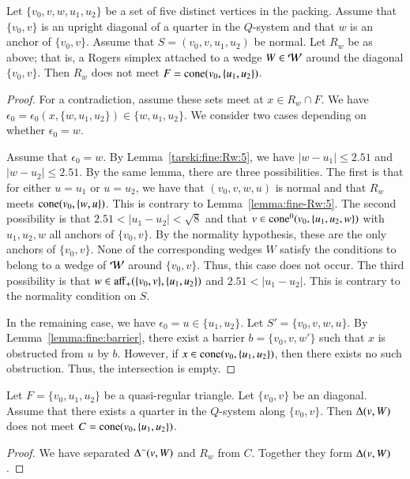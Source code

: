\begin{lemma}\label{lemma:fine-Rw:5}
Let $\{v_0,v,w,u_1,u_2\}$ be a set of five distinct vertices in the
packing.  Assume that $\{v_0,v\}$ is an upright diagonal of a quarter
in the $Q$-system and that $w$ is an anchor of $\{v_0,v\}$.
Assume that $S=(v_0,v,u_1,u_2)$ be normal.
Let $R_w$ be as above; that is, a Rogers simplex attached to a wedge
$W\in {\mathcal W}$ around the diagonal $\{v_0,v\}$.
Then $R_w$ does not meet $F={\operatorname{cone}}(v_0,\{u_1,u_2\})$.
\end{lemma}

\begin{proof}
For a contradiction, assume these sets meet at $x\in R_w\cap F$.
We have $\epsilon_0=\epsilon_0(x,\{w,u_1,u_2\})\in\{w,u_1,u_2\}$.  We consider
two cases depending on whether $\epsilon_0=w$.

Assume that $\epsilon_0=w$.  By Lemma~\ref{tarski:fine:Rw:5},
we have $|w-u_1|\le 2.51$ and $|w-u_2|\le 2.51$.  By the same
lemma, 
there are three possibilities.  The first is that
for either $u=u_1$ or $u=u_2$, we have that $(v_0,v,w,u)$ is normal
and that $R_w$ meets ${\operatorname{cone}}(v_0,\{w,u\})$.  This is contrary to
Lemma~\ref{lemma:fine-Rw:5}.
The second possibility is that
$2.51<|u_1-u_2|<\sqrt8$ and that $v\in{\operatorname{cone}}^0(v_0,\{u_1,u_2,w\})$
with $u_1,u_2,w$ all anchors of $\{v_0,v\}$.  By the normality
hypothesis, these are the only anchors of $\{v_0,v\}$.  None of the
corresponding wedges $W$ satisfy the conditions to belong to
a wedge of ${\mathcal W}$ around $\{v_0,v\}$.  Thus, this case does not
occur. The third possibility is that $w\in {\operatorname{aff}}_+(\{v_0,v\},\{u_1,u_2\})$
and $2.51<|u_1-u_2|$.  This is contrary to the normality
condition on $S$.

In the remaining case, we have $\epsilon_0=u\in\{u_1,u_2\}$.  
Let $S'=\{v_0,v,w,u\}$.  By Lemma~\ref{lemma:fine:barrier}, there
exist a barrier $b=\{v_0,v,w'\}$ such that $x$ is obstructed from
$u$ by $b$.  However, if $x\in{\operatorname{cone}}(v_0,\{u_1,u_2\})$, then
there exists no such obstruction.  Thus, the intersection
is empty.
\end{proof}

\begin{lemma}\label{lemma:delta-tri}
Let $F=\{v_0,u_1,u_2\}$ be a quasi-regular triangle.  Let $\{v_0,v\}$ be
an diagonal. Assume that there
exists a quarter in the $Q$-system along $\{v_0,v\}$.  Then
$\Delta(v,W)$ does not meet $C={\operatorname{cone}}(v_0,\{u_1,u_2\})$.
\end{lemma}

\begin{proof}
We have separated $\Delta^-(v,W)$ and $R_w$ from $C$.
Together they form $\Delta(v,W)$.
\end{proof}






